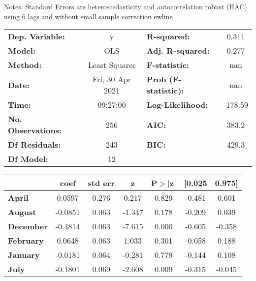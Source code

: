 Notes: \newline
 [1] Standard Errors are heteroscedasticity and autocorrelation robust (HAC) using 6 lags and without small sample correction
ewline\begin{center}
\begin{tabular}{lclc}
\toprule
\textbf{Dep. Variable:}    &        y         & \textbf{  R-squared:         } &     0.311   \\
\textbf{Model:}            &       OLS        & \textbf{  Adj. R-squared:    } &     0.277   \\
\textbf{Method:}           &  Least Squares   & \textbf{  F-statistic:       } &       nan   \\
\textbf{Date:}             & Fri, 30 Apr 2021 & \textbf{  Prob (F-statistic):} &      nan    \\
\textbf{Time:}             &     09:27:00     & \textbf{  Log-Likelihood:    } &   -178.59   \\
\textbf{No. Observations:} &         256      & \textbf{  AIC:               } &     383.2   \\
\textbf{Df Residuals:}     &         243      & \textbf{  BIC:               } &     429.3   \\
\textbf{Df Model:}         &          12      & \textbf{                     } &             \\
\bottomrule
\end{tabular}
\begin{tabular}{lcccccc}
                   & \textbf{coef} & \textbf{std err} & \textbf{z} & \textbf{P$> |$z$|$} & \textbf{[0.025} & \textbf{0.975]}  \\
\midrule
\textbf{April}     &       0.0597  &        0.276     &     0.217  &         0.829        &       -0.481    &        0.601     \\
\textbf{August}    &      -0.0851  &        0.063     &    -1.347  &         0.178        &       -0.209    &        0.039     \\
\textbf{December}  &      -0.4814  &        0.063     &    -7.615  &         0.000        &       -0.605    &       -0.358     \\
\textbf{February}  &       0.0648  &        0.063     &     1.033  &         0.301        &       -0.058    &        0.188     \\
\textbf{January}   &      -0.0181  &        0.064     &    -0.281  &         0.779        &       -0.144    &        0.108     \\
\textbf{July}      &      -0.1801  &        0.069     &    -2.608  &         0.009        &       -0.315    &       -0.045     \\

\end{tabular}
\end{center}
